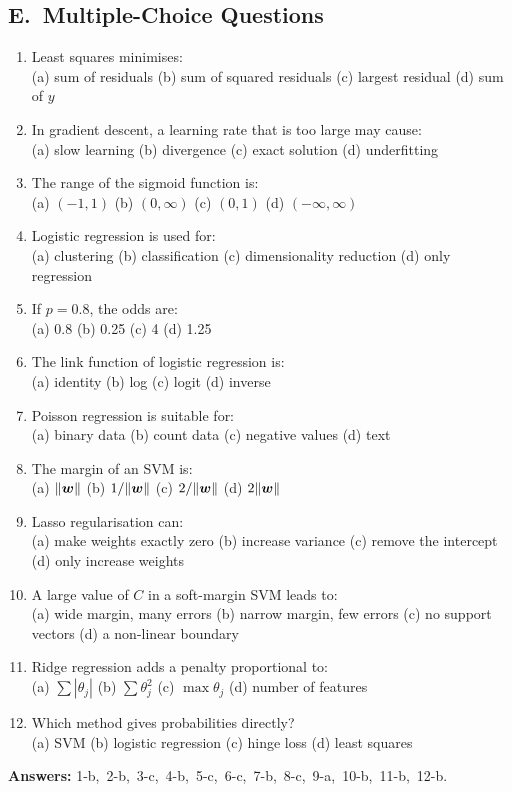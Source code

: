 \subsection*{E.\ Multiple-Choice Questions}
\begin{enumerate}
  \item Least squares minimises: \\
  (a) sum of residuals \quad (b) sum of squared residuals \quad (c) largest residual \quad (d) sum of $y$
  \item In gradient descent, a learning rate that is too large may cause: \\
  (a) slow learning \quad (b) divergence \quad (c) exact solution \quad (d) underfitting
  \item The range of the sigmoid function is: \\
  (a) $(-1,1)$ \quad (b) $(0,\infty)$ \quad (c) $(0,1)$ \quad (d) $(-\infty,\infty)$
  \item Logistic regression is used for: \\
  (a) clustering \quad (b) classification \quad (c) dimensionality reduction \quad (d) only regression
  \item If $p=0.8$, the odds are: \\
  (a) 0.8 \quad (b) 0.25 \quad (c) 4 \quad (d) 1.25
  \item The link function of logistic regression is: \\
  (a) identity \quad (b) log \quad (c) logit \quad (d) inverse
  \item Poisson regression is suitable for: \\
  (a) binary data \quad (b) count data \quad (c) negative values \quad (d) text
  \item The margin of an SVM is: \\
  (a) $\|\boldsymbol{w}\|$ \quad (b) $1/\|\boldsymbol{w}\|$ \quad (c) $2/\|\boldsymbol{w}\|$ \quad (d) $2\|\boldsymbol{w}\|$
  \item Lasso regularisation can: \\
  (a) make weights exactly zero \quad (b) increase variance \quad (c) remove the intercept \quad (d) only increase weights
  \item A large value of $C$ in a soft-margin SVM leads to: \\
  (a) wide margin, many errors \quad (b) narrow margin, few errors \quad (c) no support vectors \quad (d) a non-linear boundary
  \item Ridge regression adds a penalty proportional to: \\
  (a) $\sum|\theta_j|$ \quad (b) $\sum\theta_j^2$ \quad (c) $\max\theta_j$ \quad (d) number of features
  \item Which method gives probabilities directly? \\
  (a) SVM \quad (b) logistic regression \quad (c) hinge loss \quad (d) least squares
\end{enumerate}
\textbf{Answers:} 1-b,\ 2-b,\ 3-c,\ 4-b,\ 5-c,\ 6-c,\ 7-b,\ 8-c,\ 9-a,\ 10-b,\ 11-b,\ 12-b.

